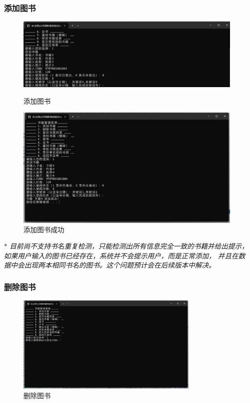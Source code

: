 \documentclass[12pt,twoside]{ctexart}
\begin{document}
\subsubsection{添加图书}

\begin{figure}[H]
    \centering
    \begin{minipage}{0.48\textwidth}
        \centering
        \includegraphics[width=\linewidth]{Book/AddBookSucc.png}
        \caption{添加图书}
    \end{minipage}
    \hfill
    \begin{minipage}{0.48\textwidth}
        \centering
        \includegraphics[width=\linewidth]{Book/AddBook.png}
        \caption{添加图书成功}
    \end{minipage}
\end{figure}

$\ast $ \textit{目前尚不支持书名重复检测，只能检测出所有信息完全一致的书籍并给出提示，
    如果用户输入的图书已经存在，系统并不会提示用户，而是正常添加，
    并且在数据中会出现两本相同书名的图书。这个问题预计会在后续版本中解决。}


\subsubsection{删除图书}

\begin{figure}[H]
    \centering
    \includegraphics[width=0.8\textwidth]{Book/DeleteBookMenu.png}
    \caption{删除图书}
    \label{fig:DeleteBook}
\end{figure}
\end{document}
